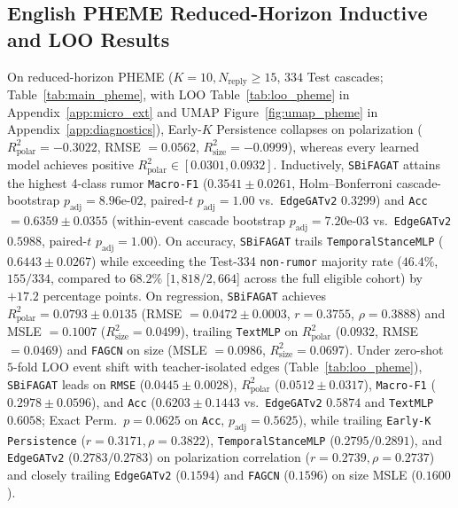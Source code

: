\documentclass[conference]{IEEEtran}
\begin{document}
\subsection{English PHEME Reduced-Horizon Inductive and LOO Results}
On reduced-horizon PHEME ($K=10, N_{\text{reply}} \ge 15$, $334$ Test cascades; Table~\ref{tab:main_pheme}, with LOO Table~\ref{tab:loo_pheme} in Appendix~\ref{app:micro_ext} and UMAP Figure~\ref{fig:umap_pheme} in Appendix~\ref{app:diagnostics}), Early-$K$ Persistence collapses on polarization ($R^2_{\text{polar}} = -0.3022$, RMSE $= 0.0562$, $R^2_{\text{size}} = -0.0999$), whereas every learned model achieves positive $R^2_{\text{polar}} \in [0.0301, 0.0932]$. Inductively, \texttt{SBiFAGAT} attains the highest 4-class rumor \texttt{Macro-F1} ($0.3541 \pm 0.0261$, Holm--Bonferroni cascade-bootstrap $p_{\text{adj}} = 8.96\text{e-}02$, paired-$t$ $p_{\text{adj}} = 1.00$ vs.\ \texttt{EdgeGATv2} $0.3299$) and \texttt{Acc} $= 0.6359 \pm 0.0355$ (within-event cascade bootstrap $p_{\text{adj}} = 7.20\text{e-}03$ vs.\ \texttt{EdgeGATv2} $0.5988$, paired-$t$ $p_{\text{adj}} = 1.00$). On accuracy, \texttt{SBiFAGAT} trails \texttt{TemporalStanceMLP} ($0.6443 \pm 0.0267$) while exceeding the Test-334 \texttt{non-rumor} majority rate ($46.4\%$, $155/334$, compared to $68.2\%$ [$1{,}818/2{,}664$] across the full eligible cohort) by $+17.2$ percentage points. On regression, \texttt{SBiFAGAT} achieves $R^2_{\text{polar}} = 0.0793 \pm 0.0135$ (RMSE $= 0.0472 \pm 0.0003$, $r = 0.3755$, $\rho = 0.3888$) and MSLE $= 0.1007$ ($R^2_{\text{size}} = 0.0499$), trailing \texttt{TextMLP} on $R^2_{\text{polar}}$ ($0.0932$, RMSE $= 0.0469$) and \texttt{FAGCN} on size (MSLE $= 0.0986$, $R^2_{\text{size}} = 0.0697$). Under zero-shot $5$-fold LOO event shift with teacher-isolated edges (Table~\ref{tab:loo_pheme}), \texttt{SBiFAGAT} leads on \texttt{RMSE} ($0.0445 \pm 0.0028$), $R^2_{\text{polar}}$ ($0.0512 \pm 0.0317$), \texttt{Macro-F1} ($0.2978 \pm 0.0596$), and \texttt{Acc} ($0.6203 \pm 0.1443$ vs.\ \texttt{EdgeGATv2} $0.5874$ and \texttt{TextMLP} $0.6058$; Exact Perm.\ $p = 0.0625$ on \texttt{Acc}, $p_{\text{adj}} = 0.5625$), while trailing \texttt{Early-K Persistence} ($r = 0.3171, \rho = 0.3822$), \texttt{TemporalStanceMLP} ($0.2795 / 0.2891$), and \texttt{EdgeGATv2} ($0.2783 / 0.2783$) on polarization correlation ($r = 0.2739, \rho = 0.2737$) and closely trailing \texttt{EdgeGATv2} ($0.1594$) and \texttt{FAGCN} ($0.1596$) on size MSLE ($0.1600$).

\end{document}
